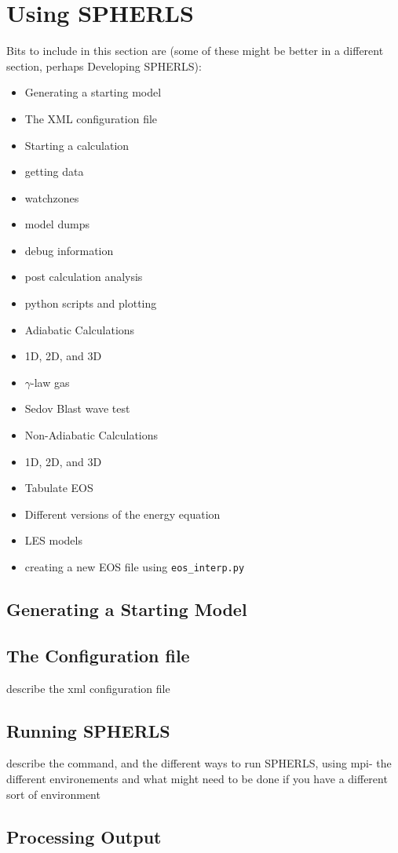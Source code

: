 \documentclass[12pt,a4paper]{book}
\begin{document}
\chapter{Using SPHERLS}
Bits to include in this section are (some of these might be better in a different section, perhaps Developing SPHERLS):
\begin{itemize}
\item Generating a starting model
\item The XML configuration file
\item Starting a calculation
\item getting data
\item watchzones
\item model dumps
\item debug information
\item post calculation analysis
\item python scripts and plotting
\item Adiabatic Calculations
\item 1D, 2D, and 3D
\item $\gamma$-law gas
\item Sedov Blast wave test
\item Non-Adiabatic Calculations
\item 1D, 2D, and 3D
\item Tabulate EOS
\item Different versions of the energy equation
\item LES models
\item creating a new EOS file using {\tt eos\_interp.py}
\end{itemize}

\section{Generating a Starting Model}
\section{The Configuration file}
describe the xml configuration file
\section{Running SPHERLS}
describe the command, and the different ways to run SPHERLS, using mpi- the different environements and what might need to be done if you have a different sort of environment
\section{Processing Output}
\end{document}
